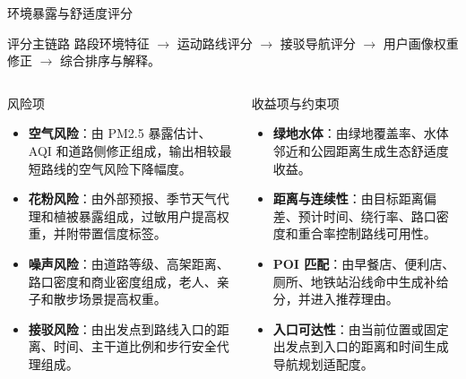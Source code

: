 \documentclass[xcolor=table,dvipsnames,svgnames,aspectratio=169]{ctexbeamer}
\newcommand{\kw}[1]{\textbf{\color{cprimary}#1}}
\newcommand{\smallitem}{\setlength{\itemsep}{0.25em}}
\begin{document}
\begin{frame}{环境暴露与舒适度评分}
  \scriptsize
  \begin{block}{评分主链路}
    路段环境特征 $\rightarrow$ 运动路线评分 $\rightarrow$ 接驳导航评分 $\rightarrow$ 用户画像权重修正 $\rightarrow$ 综合排序与解释。
  \end{block}

  \vspace{0.1em}
  \begin{columns}[T]
    \begin{block}{风险项}
      \begin{itemize}
        \smallitem
        \item \kw{空气风险}：由 PM2.5 暴露估计、AQI 和道路侧修正组成，输出相较最短路线的空气风险下降幅度。
        \item \kw{花粉风险}：由外部预报、季节天气代理和植被暴露组成，过敏用户提高权重，并附带置信度标签。
        \item \kw{噪声风险}：由道路等级、高架距离、路口密度和商业密度组成，老人、亲子和散步场景提高权重。
        \item \kw{接驳风险}：由出发点到路线入口的距离、时间、主干道比例和步行安全代理组成。
      \end{itemize}
    \end{block}

    \begin{block}{收益项与约束项}
      \begin{itemize}
        \smallitem
        \item \kw{绿地水体}：由绿地覆盖率、水体邻近和公园距离生成生态舒适度收益。
        \item \kw{距离与连续性}：由目标距离偏差、预计时间、绕行率、路口密度和重合率控制路线可用性。
        \item \kw{POI 匹配}：由早餐店、便利店、厕所、地铁站沿线命中生成补给分，并进入推荐理由。
        \item \kw{入口可达性}：由当前位置或固定出发点到入口的距离和时间生成导航规划适配度。
      \end{itemize}
    \end{block}
  \end{columns}
\end{frame}
\end{document}
